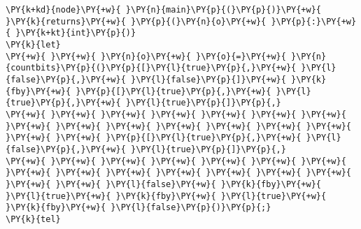 \begin{Verbatim}[commandchars=\\\{\}]
\PY{k+kd}{node}\PY{+w}{ }\PY{n}{main}\PY{p}{(}\PY{p}{)}\PY{+w}{ }\PY{k}{returns}\PY{+w}{ }\PY{p}{(}\PY{n}{o}\PY{+w}{ }\PY{p}{:}\PY{+w}{ }\PY{k+kt}{int}\PY{p}{)}
\PY{k}{let}
\PY{+w}{ }\PY{+w}{ }\PY{n}{o}\PY{+w}{ }\PY{o}{=}\PY{+w}{ }\PY{n}{countbits}\PY{p}{(}\PY{p}{[}\PY{l}{true}\PY{p}{,}\PY{+w}{ }\PY{l}{false}\PY{p}{,}\PY{+w}{ }\PY{l}{false}\PY{p}{]}\PY{+w}{ }\PY{k}{fby}\PY{+w}{ }\PY{p}{[}\PY{l}{true}\PY{p}{,}\PY{+w}{ }\PY{l}{true}\PY{p}{,}\PY{+w}{ }\PY{l}{true}\PY{p}{]}\PY{p}{,}
\PY{+w}{ }\PY{+w}{ }\PY{+w}{ }\PY{+w}{ }\PY{+w}{ }\PY{+w}{ }\PY{+w}{ }\PY{+w}{ }\PY{+w}{ }\PY{+w}{ }\PY{+w}{ }\PY{+w}{ }\PY{+w}{ }\PY{+w}{ }\PY{+w}{ }\PY{+w}{ }\PY{p}{[}\PY{l}{true}\PY{p}{,}\PY{+w}{ }\PY{l}{false}\PY{p}{,}\PY{+w}{ }\PY{l}{true}\PY{p}{]}\PY{p}{,}
\PY{+w}{ }\PY{+w}{ }\PY{+w}{ }\PY{+w}{ }\PY{+w}{ }\PY{+w}{ }\PY{+w}{ }\PY{+w}{ }\PY{+w}{ }\PY{+w}{ }\PY{+w}{ }\PY{+w}{ }\PY{+w}{ }\PY{+w}{ }\PY{+w}{ }\PY{+w}{ }\PY{l}{false}\PY{+w}{ }\PY{k}{fby}\PY{+w}{ }\PY{l}{true}\PY{+w}{ }\PY{k}{fby}\PY{+w}{ }\PY{l}{true}\PY{+w}{ }\PY{k}{fby}\PY{+w}{ }\PY{l}{false}\PY{p}{)}\PY{p}{;}
\PY{k}{tel}
\end{Verbatim}
